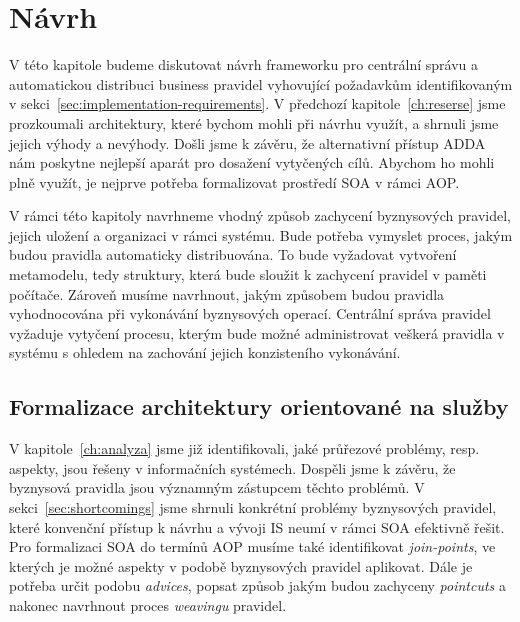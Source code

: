

\chapter{Návrh}\label{ch:navrh}

V této kapitole budeme diskutovat návrh frameworku pro centrální správu
a automatickou distribuci business pravidel vyhovující požadavkům identifikovaným
v sekci~\ref{sec:implementation-requirements}. V předchozí kapitole~\ref{ch:reserse}
jsme prozkoumali architektury, které bychom mohli při návrhu využít, a shrnuli
jsme jejich výhody a nevýhody. Došli jsme k závěru, že alternativní přístup \gls{ADDA}
nám poskytne nejlepší aparát pro dosažení vytyčených cílů. Abychom ho mohli plně využít,
je nejprve potřeba formalizovat prostředí \gls{SOA} v rámci \gls{AOP}.

V rámci této kapitoly navrhneme vhodný způsob zachycení byznysových pravidel,
jejich uložení a organizaci v rámci systému. Bude potřeba vymyslet proces, jakým budou pravidla
automaticky distribuována. To bude vyžadovat vytvoření metamodelu, tedy struktury, která bude
sloužit k zachycení pravidel v paměti počítače.
Zároveň musíme navrhnout, jakým způsobem budou pravidla vyhodnocována při vykonávání byznysových operací.
Centrální správa pravidel vyžaduje vytyčení procesu, kterým bude možné administrovat
veškerá pravidla v systému s ohledem na zachování jejich konzisteního vykonávání.

\section{Formalizace architektury orientované na služby}

V kapitole~\ref{ch:analyza} jsme již identifikovali, jaké průřezové problémy, resp. aspekty,
jsou řešeny v informačních systémech. Dospěli jsme k závěru, že byznysová pravidla jsou
významným zástupcem těchto problémů. V sekci~\ref{sec:shortcomings} jsme shrnuli konkrétní
problémy byznysových pravidel, které konvenční přístup k návrhu a vývoji \gls{IS} neumí v rámci \gls{SOA} efektivně řešit.
Pro formalizaci \gls{SOA} do termínů \gls{AOP} musíme také identifikovat \textit{join-points},
ve kterých je možné aspekty v podobě byznysových pravidel aplikovat. Dále je potřeba určit podobu
\textit{advices}, popsat způsob jakým budou zachyceny \textit{pointcuts} a nakonec navrhnout proces
\textit{weavingu} pravidel.

